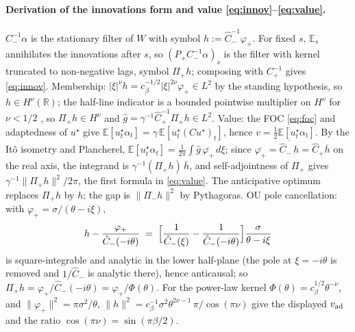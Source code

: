 \documentclass[11pt]{article}
\newcommand{\R}{\mathbb{R}}
\newcommand{\E}{\mathbb{E}}
\theoremstyle{plain}
\begin{document}
\paragraph{Derivation of the innovations form and value \eqref{eq:innov}--\eqref{eq:value}.} $C_-^{-1}\alpha$ is the stationary filter of $W$ with symbol $h := \hat C_-^{-1}\varphi_+$. For fixed $s$, $\E_s$ annihilates the innovations after $s$, so $(P_+C_-^{-1}\alpha)_s$ is the filter with kernel truncated to non-negative lags, symbol $\Pi_+h$; composing with $C_+^{-1}$ gives \eqref{eq:innov}. Membership: $|\xi|^\nu h = c_\beta^{-1/2}|\xi|^{2\nu}\varphi_+\in L^2$ by the standing hypothesis, so $h\in H^\nu(\R)$; the half-line indicator is a bounded pointwise multiplier on $H^\nu$ for $\nu<1/2$ \citep[Ch.~1]{LionsMagenes1972}, so $\Pi_+h\in H^\nu$ and $\hat g = \gamma^{-1}\hat C_+^{-1}\Pi_+h\in L^2$. Value: the FOC \eqref{eq:foc} and adaptedness of $u^\star$ give $\E[u^\star_t\alpha_t] = \gamma\,\E[u^\star_t(Cu^\star)_t]$, hence $v = \tfrac12\E[u^\star_t\alpha_t]$. By the It\^o isometry and Plancherel, $\E[u^\star_t\alpha_t] = \tfrac{1}{2\pi}\int\hat g\,\overline{\varphi_+}\,d\xi$; since $\overline{\varphi_+} = \overline{\hat C_-\,h} = \hat C_+\overline{h}$ on the real axis, the integrand is $\gamma^{-1}(\Pi_+h)\,\overline{h}$, and self-adjointness of $\Pi_+$ gives $\gamma^{-1}\|\Pi_+h\|^2/2\pi$, the first formula in \eqref{eq:value}. The anticipative optimum replaces $\Pi_+h$ by $h$; the gap is $\|\Pi_-h\|^2$ by Pythagoras. OU pole cancellation: with $\varphi_+ = \sigma/(\theta-i\xi)$,
\[
h - \frac{\varphi_+}{\hat C_-(-i\theta)} \;=\; \Bigl[\frac{1}{\hat C_-(\xi)} - \frac{1}{\hat C_-(-i\theta)}\Bigr]\frac{\sigma}{\theta-i\xi}
\]
is square-integrable and analytic in the lower half-plane (the pole at $\xi = -i\theta$ is removed and $1/\hat C_-$ is analytic there), hence anticausal; so $\Pi_+h = \varphi_+/\hat C_-(-i\theta) = \varphi_+/\Phi(\theta)$. For the power-law kernel $\Phi(\theta) = c_\beta^{1/2}\theta^{-\nu}$, and $\|\varphi_+\|^2 = \pi\sigma^2/\theta$, $\|h\|^2 = c_\beta^{-1}\sigma^2\theta^{2\nu-1}\,\pi/\cos(\pi\nu)$ give the displayed $v_{\rm ad}$ and the ratio $\cos(\pi\nu) = \sin(\pi\beta/2)$.
\end{document}
